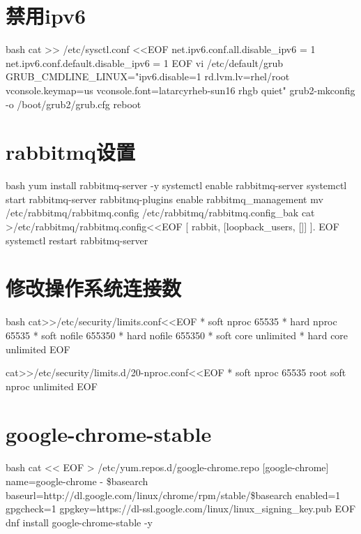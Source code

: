 \section{禁用ipv6}
\begin{code-block}{bash}
cat >> /etc/sysctl.conf <<EOF
net.ipv6.conf.all.disable_ipv6 = 1
net.ipv6.conf.default.disable_ipv6 = 1
EOF
vi /etc/default/grub
GRUB_CMDLINE_LINUX="ipv6.disable=1 rd.lvm.lv=rhel/root vconsole.keymap=us vconsole.font=latarcyrheb-sun16 rhgb quiet"
grub2-mkconfig -o /boot/grub2/grub.cfg
reboot
\end{code-block}

\section{rabbitmq设置}
\begin{code-block}{bash}
yum install rabbitmq-server -y
systemctl enable rabbitmq-server
systemctl start rabbitmq-server
rabbitmq-plugins enable rabbitmq_management
mv /etc/rabbitmq/rabbitmq.config /etc/rabbitmq/rabbitmq.config_bak
cat >/etc/rabbitmq/rabbitmq.config<<EOF
[
{rabbit, [{loopback_users, []}]}
].
EOF
systemctl restart rabbitmq-server
\end{code-block}

\section{修改操作系统连接数}
\begin{code-block}{bash}
cat>>/etc/security/limits.conf<<EOF
*               soft    nproc           65535
*               hard    nproc           65535
*               soft    nofile          655350
*               hard    nofile          655350
*               soft    core            unlimited
*               hard    core            unlimited
EOF

cat>>/etc/security/limits.d/20-nproc.conf<<EOF
*          soft    nproc     65535
root       soft    nproc     unlimited
EOF
\end{code-block}

\section{google-chrome-stable}
\begin{code-block}{bash}
cat << EOF > /etc/yum.repos.d/google-chrome.repo
[google-chrome]
name=google-chrome - \$basearch
baseurl=http://dl.google.com/linux/chrome/rpm/stable/\$basearch
enabled=1
gpgcheck=1
gpgkey=https://dl-ssl.google.com/linux/linux_signing_key.pub
EOF
dnf install google-chrome-stable -y
\end{code-block}

